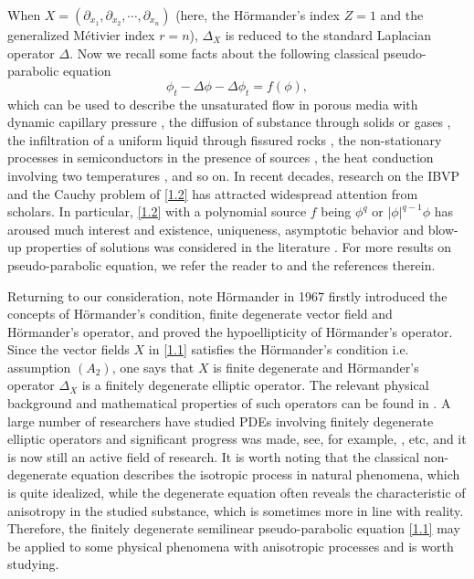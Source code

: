 \documentclass[11pt,a4paper]{article}
\numberwithin{equation}{section}
\numberwithin{remark}{section}
\begin{document}
When $X=(\partial_{x_1},\partial_{x_2},\cdots,\partial_{x_n})$ (here, the H\"{o}rmander's index $Z=1$ and the generalized M\'{e}tivier index $r=n$), $\Delta_X$ is reduced to the standard Laplacian operator $\Delta$.
Now we recall some facts about the following classical pseudo-parabolic equation
\begin{equation}\label{1.2}
\phi_t-\Delta\phi-\Delta\phi_t=f(\phi),
\end{equation}
which can be used to describe the unsaturated flow in porous media with dynamic capillary pressure \cite{MR2593053}, the diffusion of substance through solids or gases \cite{MR586062,MR1575106}, the infiltration of a uniform liquid through fissured rocks \cite{Barenblatt1960theory}, the non-stationary processes in semiconductors in the presence of sources \cite{MR2198478,MR2290551}, the heat conduction involving two temperatures \cite{chen1968theory}, and so on.
In recent decades, research on the IBVP and the Cauchy problem of \eqref{1.2} has attracted widespread attention from scholars. In particular, \eqref{1.2} with a polynomial source $f$ being $\phi^q$ or $|\phi|^{q-1}\phi$ has aroused much  interest  and existence, uniqueness, asymptotic behavior and blow-up properties of solutions was considered  in the literature \cite{MR2523294,MR2981259,MR3045640,MR3372307,MR3745341}. For more results on pseudo-parabolic equation, we refer the reader to  \cite{MR437936,MR330774,MR264231,MR3987484,MR2454799,MR4145829,MR4295069,Cao2024review,MR4839772} and the references therein.

Returning to our consideration, note  H\"{o}rmander \cite{MR222474} in 1967 firstly introduced the concepts of H\"{o}rmander's condition, finite degenerate vector field and H\"{o}rmander's operator, and proved the hypoellipticity of H\"{o}rmander's operator. Since the vector fields $X$ in \eqref{1.1} satisfies the H\"{o}rmander's condition i.e. assumption $(A_2)$, one says that $X$ is finite degenerate and H\"{o}rmander's operator $\Delta_X$ is a finitely degenerate elliptic operator. The relevant physical background and mathematical properties of such operators can be found in \cite{MR427858,MR512213,MR762360,MR865430,MR3154431,MR2200233,MR3412394,MR222474,MR3354435}. A large number of researchers have studied PDEs involving finitely degenerate elliptic operators and significant progress was made, see, for example, \cite{MR1087376,MR1305697,MR2200233,MR222474,MR3961341,MR4068818,MR4709392}, etc, and it is now still an active field of research. It is worth noting that the classical non-degenerate equation describes the isotropic process in natural phenomena, which is quite idealized, while the degenerate equation often reveals the characteristic of anisotropy in the studied substance, which is sometimes more in line with reality. Therefore, the finitely degenerate semilinear pseudo-parabolic equation \eqref{1.1} may be applied to some physical phenomena with anisotropic processes and is worth studying.
\end{document}

